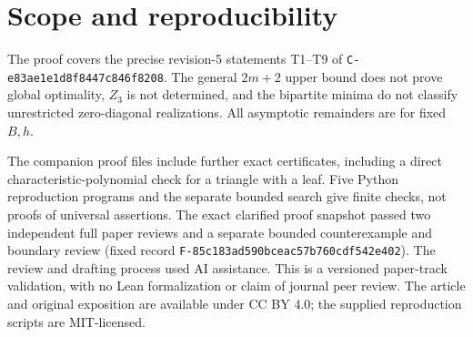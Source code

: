 \documentclass[11pt]{article}
\begin{document}
\section{Scope and reproducibility}
The proof covers the precise revision-5 statements T1--T9 of
\texttt{C-e83ae1e1d8f8447c846f8208}. The general \(2m+2\) upper bound
does not prove global optimality, \(Z_3\) is not determined, and the
bipartite minima do not classify unrestricted zero-diagonal realizations.
All asymptotic remainders are for fixed \(B,h\).

The companion proof files include further exact certificates, including
a direct characteristic-polynomial check for a triangle with a leaf.
Five Python reproduction programs and the separate bounded search give
finite checks, not proofs of universal assertions. The exact clarified
proof snapshot passed two independent full paper reviews and a separate
bounded counterexample and boundary review
(fixed record \texttt{F-85c183ad590bceac57b760cdf542e402}).
The review and drafting process used AI assistance. This is a
versioned paper-track validation, with no Lean formalization or claim of
journal peer review. The article and original exposition are available
under CC BY 4.0; the supplied reproduction scripts are MIT-licensed.



\end{document}
